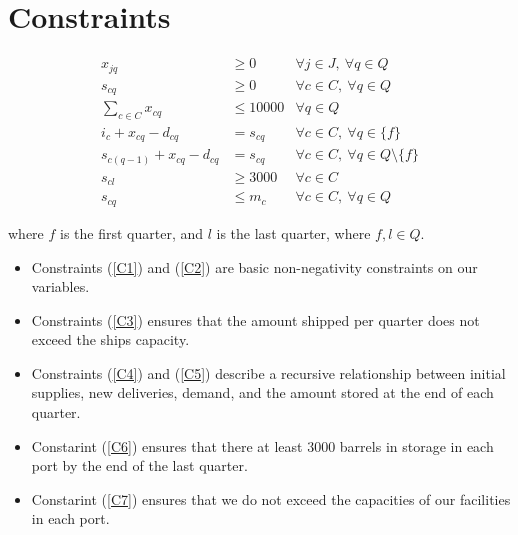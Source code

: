 \documentclass[a4paper]{article}
\begin{document}
\section*{Constraints}

\begin{align}
x_{jq} & \geq 0 & \forall j \in J,\  \forall q \in Q \label{C1}\\
s_{cq} & \geq 0 & \forall c \in C,\  \forall q \in Q \label{C2}\\
\sum_{c \in C} x_{cq} & \leq 10000 & \forall q \in Q \label{C3}\\
i_{c} +  x_{cq} - d_{cq} & = s_{cq} & \forall c \in C,\  \forall q \in \{ f \} \label{C4}\\
s_{c(q - 1)} +  x_{cq} - d_{cq} & = s_{cq} & \forall c \in C,\  \forall q \in Q \setminus \{ f \} \label{C5}\\
s_{cl} & \geq 3000 & \forall c \in C \label{C6}\\
s_{cq} & \leq m_c & \forall c \in C,\  \forall q \in Q \label{C7}
\end{align}

where $f$ is the first quarter, and $l$ is the last quarter, where $f, l \in Q$.
\begin{itemize}
    \item Constraints (\ref{C1}) and (\ref{C2}) are basic non-negativity constraints on our variables. 
    \item Constraints (\ref{C3}) ensures that the amount shipped per quarter does not exceed the ships capacity.
    \item Constraints (\ref{C4}) and (\ref{C5}) describe a recursive relationship between initial supplies, new deliveries, demand, and the amount stored at the end of each quarter.
    \item Constarint (\ref{C6}) ensures that there at least 3000 barrels in storage in each port by the end of the last quarter.
    \item Constarint (\ref{C7}) ensures that we do not exceed the capacities of our facilities in each port.
\end{itemize}
\end{document}
